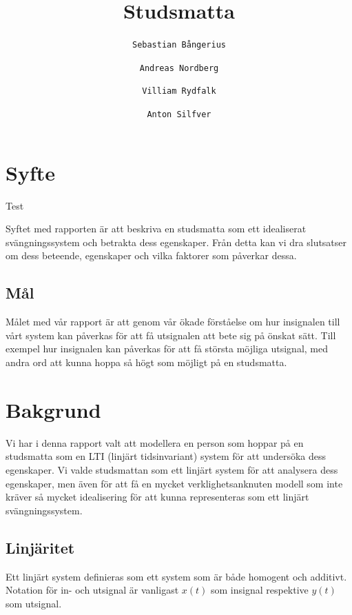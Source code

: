 \documentclass[10pt,a4paper]{article}
\author{
  \texttt{Sebastian Bångerius}
  \and
  \texttt{Andreas Nordberg}
  \and
  \texttt{Villiam Rydfalk}
  \and
  \texttt{Anton Silfver}
}
\begin{document}

\title{Studsmatta}
\maketitle

\cleardoublepage

\tableofcontents

\clearpage

\section{Syfte}
\setcounter{page}{3}

Test

Syftet med rapporten är att beskriva en studsmatta som ett idealiserat svängningssystem och betrakta dess egenskaper. Från detta kan vi dra slutsatser om dess beteende, egenskaper och vilka faktorer som påverkar dessa.

\subsection{Mål}
Målet med vår rapport är att genom vår ökade förståelse om hur insignalen till vårt system kan påverkas för att få utsignalen att bete sig på önskat sätt. Till exempel hur insignalen kan påverkas för att få största möjliga utsignal, med andra ord att kunna hoppa så högt som möjligt på en studsmatta.



\section{Bakgrund}

Vi har i denna rapport valt att modellera en person som hoppar på en studsmatta som en LTI (linjärt tidsinvariant) system för att undersöka dess egenskaper. Vi valde studsmattan som ett linjärt system för att analysera dess egenskaper, men även för att få en mycket verklighetsanknuten modell som inte kräver så mycket idealisering för att kunna representeras som ett linjärt svängningssystem.

\subsection{Linjäritet}

Ett linjärt system definieras som ett system som är både homogent och additivt. Notation för in- och utsignal är vanligast $x(t)$ som insignal respektive $y(t)$ som utsignal.
\end{document}
